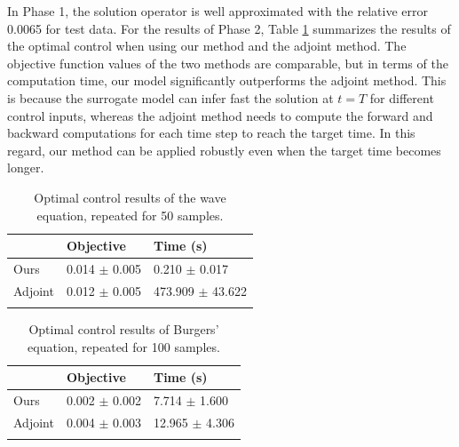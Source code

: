 \documentclass[letterpaper]{article}
\begin{document}
In Phase 1, the solution operator is well approximated with the relative error 0.0065 for test data. For the results of Phase 2, Table \ref{wave_table} summarizes the results of the optimal control when using our method and the adjoint method. The objective function values of the two methods are comparable, but in terms of the computation time, our model significantly outperforms the adjoint method. This is because the surrogate model can infer fast the solution at $t=T$ for different control inputs, whereas the adjoint method needs to compute the forward and backward computations for each time step to reach the target time. In this regard, our method can be applied robustly even when the target time becomes longer.





\begin{table}[t]
\centering
\begin{tabular}{lll}
    \Xhline{1pt}
    
            & Objective     & Time (s)  \\ 
    \hline
    Ours    & 0.014 $\pm$ 0.005   & 0.210 $\pm$ 0.017  \\ 
    Adjoint & 0.012 $\pm$ 0.005   & 473.909 $\pm$ 43.622  \\ 
    \Xhline{1pt}
    
\end{tabular}
\caption{Optimal control results of the wave equation, repeated for 50 samples.}
\label{wave_table}
\end{table}


\begin{table}[t]
\centering
\begin{tabular}{lll}
    \Xhline{1pt}
    
            & Objective     & Time (s)  \\ 
    \hline
    Ours & 0.002 $\pm$ 0.002  &  7.714 $\pm$ 1.600   \\ 
    Adjoint    & 0.004 $\pm$ 0.003      & 12.965 $\pm$ 4.306      \\ 
    \Xhline{1pt}
    
\end{tabular}
\caption{Optimal control results of Burgers' equation, repeated for 100 samples.}
    \label{burgers_table}
\end{table}
\end{document}
